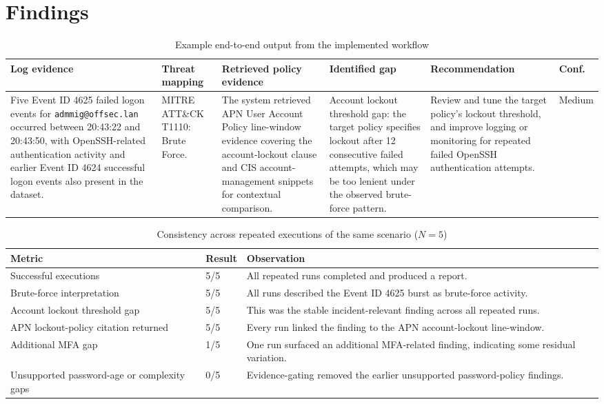 \documentclass[conference]{IEEEtran}
\begin{document}
\section{Findings}

\begin{table}[t]
\centering
\caption{Example end-to-end output from the implemented workflow}
\scriptsize
\setlength{\tabcolsep}{2pt}
\begin{tabular}{|p{}|p{}|p{}|p{}|p{}|p{}|}
\hline
\textbf{Log evidence} & \textbf{Threat mapping} & \textbf{Retrieved policy evidence} & \textbf{Identified gap} & \textbf{Recommendation} & \textbf{Conf.} \\
\hline
Five Event ID 4625 failed logon events for \texttt{admmig@offsec.lan} occurred between 20:43:22 and 20:43:50, with OpenSSH-related authentication activity and earlier Event ID 4624 successful logon events also present in the dataset. &
MITRE ATT\&CK T1110: Brute Force. &
The system retrieved APN User Account Policy line-window evidence covering the account-lockout clause and CIS account-management snippets for contextual comparison. &
Account lockout threshold gap: the target policy specifies lockout after 12 consecutive failed attempts, which may be too lenient under the observed brute-force pattern. &
Review and tune the target policy's lockout threshold, and improve logging or monitoring for repeated failed OpenSSH authentication attempts. &
Medium \\
\hline
\end{tabular}
\label{tab:end_to_end_output}
\end{table}

\begin{table}[t]
\centering
\caption{Consistency across repeated executions of the same scenario ($N=5$)}
\scriptsize
\setlength{\tabcolsep}{3pt}
\begin{tabular}{|p{}|p{}|p{}|}
\hline
\textbf{Metric} & \textbf{Result} & \textbf{Observation} \\
\hline
Successful executions & 5/5 & All repeated runs completed and produced a report. \\
\hline
Brute-force interpretation & 5/5 & All runs described the Event ID 4625 burst as brute-force activity. \\
\hline
Account lockout threshold gap & 5/5 & This was the stable incident-relevant finding across all repeated runs. \\
\hline
APN lockout-policy citation returned & 5/5 & Every run linked the finding to the APN account-lockout line-window. \\
\hline
Additional MFA gap & 1/5 & One run surfaced an additional MFA-related finding, indicating some residual variation. \\
\hline
Unsupported password-age or complexity gaps & 0/5 & Evidence-gating removed the earlier unsupported password-policy findings. \\
\hline
\end{tabular}
\label{tab:consistency_results}
\end{table}
\end{document}
